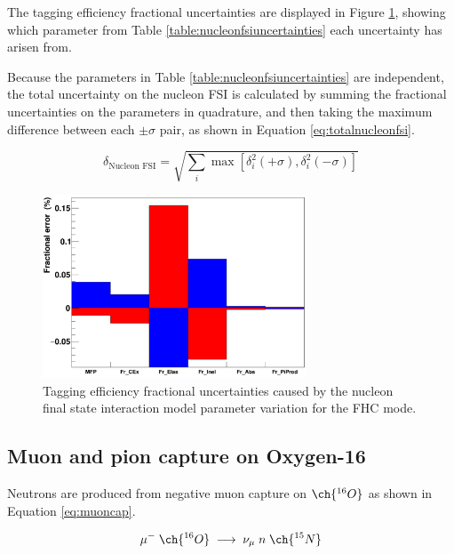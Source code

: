 The tagging efficiency fractional uncertainties are displayed in Figure \ref{fig:nucleonfsiuncertainty}, showing which parameter from Table \ref{table:nucleonfsiuncertainties} each uncertainty has arisen from.

Because the parameters in Table \ref{table:nucleonfsiuncertainties} are independent, the total uncertainty on the nucleon FSI is calculated by summing the fractional uncertainties on the parameters in quadrature, and then taking the maximum difference between each $\pm \sigma$ pair, as shown in Equation \ref{eq:totalnucleonfsi}.

\begin{equation}
    \delta_{\text{Nucleon FSI}}=\sqrt{\sum_i \max \left[\delta_i^2(+\sigma), \delta_i^2(-\sigma)\right]}
\label{eq:totalnucleonfsi}
\end{equation}

\begin{figure}[!htb]
\centering 
    \includegraphics[width=0.7\textwidth]{Figures/nucleonfsi_uncertainty.png}
\caption{Tagging efficiency fractional uncertainties caused by the nucleon final state interaction model parameter variation for the FHC mode.}
\label{fig:nucleonfsiuncertainty}
\end{figure}

\subsection{Muon and pion capture on Oxygen-16}

Neutrons are produced from negative muon capture on $\ch{^{16}O}$ as shown in Equation \ref{eq:muoncap}.

\begin{equation}
        \mu^{-}\;\ch{^{16}{O}}\;\longrightarrow\;\nu_{\mu}\;n\;\ch{^{15}{N}}
\label{eq:muoncap}
\end{equation}

